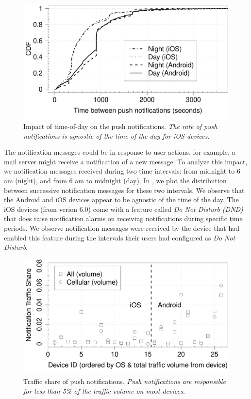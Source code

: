 \begin{figure}
\centering
\includegraphics[width=\columnwidth]{plots/push_compare_diurnal_wild_distrib.pdf}
\caption{Impact of time-of-day on the push notifications. \emph{The rate of push notifications is agnostic of the time of the day for iOS devices.}}
\label{fig:push-wild-diurnal}
\end{figure}

The notification messages could be in response to user actions, for example, a mail server might receive a notification of a new message.
To analyze this impact, we notification messages received during two time intervals: from midnight to 6 am (night), and from 6 am to midnight (day). 
In , we plot the distribution between successive notification messages for these two intervals. 
We observe that the Android and iOS devices appear to be agnostic of the time of the day. 
The iOS devices (from verion 6.0) come with a feature called \emph{Do Not Disturb (DND)} that does raise notification alarms on receiving notifications during specific time periods. 
We observe notification messages were received by the device that had enabled this feature during the intervals their users had configured as \emph{Do Not Disturb}.

\begin{figure}
\centering
\includegraphics[width=\columnwidth]{plots/push_compare_trafficshare.pdf}
\caption{Traffic share of push notifications. \emph{Push notifications are responsible for less than 5\% of the traffic volume on most devices.}}
\label{fig:push-traffic-share}
\end{figure}

